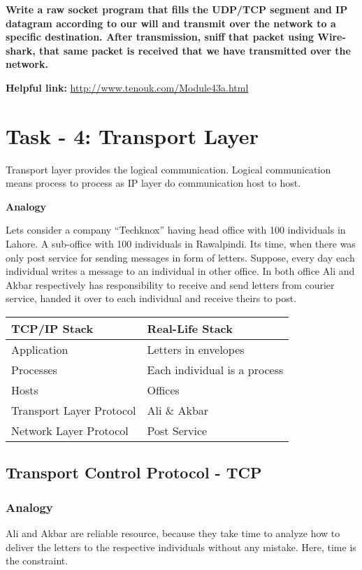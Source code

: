 \documentclass[letterpaper,10pt,english]{sphinxmanual}
\begin{document}
\textbf{Write a raw socket program that fills the UDP/TCP segment and IP datagram according to our will and transmit over the network to a specific destination. After transmission, sniff that packet using Wire-shark, that same packet is received that we have transmitted over the network.}

\textbf{Helpful link:} \href{http://www.tenouk.com/Module43a.html}{http://www.tenouk.com/Module43a.html}


\section{Task - 4: Transport Layer}
\label{week-06:task-4-transport-layer}
Transport layer provides the logical communication. Logical communication means process to process as IP layer do communication host to host.

\textbf{Analogy}

Lets consider a company “Techknox” having head office with 100 individuals in Lahore. A sub-office with 100 individuals in Rawalpindi. Its time, when there was only post service for sending messages in form of letters. Suppose, every day each individual writes a message to an individual in other office. In both office Ali and Akbar respectively has responsibility to receive and send letters from courier service, handed it over to each individual and receive theirs to post.

\begin{tabulary}{\linewidth}{|L|L|}
\hline
\textsf{\relax 
TCP/IP Stack
} & \textsf{\relax 
Real-Life Stack
}\\
\hline
Application
 & 
Letters in envelopes
\\
\hline
Processes
 & 
Each individual is a process
\\
\hline
Hosts
 & 
Offices
\\
\hline
Transport Layer Protocol
 & 
Ali \& Akbar
\\
\hline
Network Layer Protocol
 & 
Post Service
\\
\hline\end{tabulary}



\subsection{Transport Control Protocol - TCP}
\label{week-06:transport-control-protocol-tcp}

\subsubsection{Analogy}
\label{week-06:analogy}
Ali and Akbar are reliable resource, because they take time to analyze how to deliver the letters to the respective individuals without any mistake. Here, time is the constraint.
\end{document}

